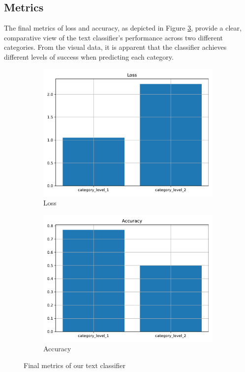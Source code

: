 \subsection{Metrics}

The final metrics of loss and accuracy, as depicted in Figure \ref{fig:classifier_final_metrics}, provide a clear, comparative view of the text classifier's performance across two different categories. From the visual data, it is apparent that the classifier achieves different levels of success when predicting each category. 

\begin{figure}[htpb]
	\centering
	\begin{subfigure}{0.48\linewidth}
		\centering
		\includegraphics[width=\linewidth]{Images/final_loss_categories.pdf}
		\caption{Loss}
		\label{fig:classifier_final_loss}
	\end{subfigure}
	\begin{subfigure}{0.48\linewidth}
		\centering
		\includegraphics[width=\linewidth]{Images/final_accuracy_categories.pdf}
		\caption{Accuracy}
		\label{fig:classifier_final_accuracy}
	\end{subfigure}
	\caption{Final metrics of our text classifier}
	\label{fig:classifier_final_metrics}
\end{figure}


